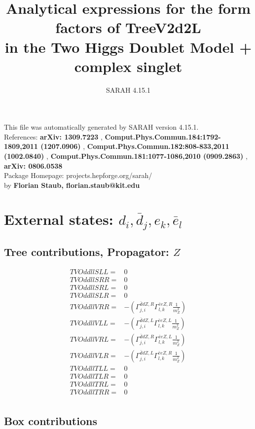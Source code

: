 \documentclass[A4,landscape]{article}
\begin{document}
\title{Analytical expressions for the form factors of TreeV2d2L\\ in the Two Higgs Doublet Model + complex singlet } 
 \author{SARAH 4.15.1} 
 \maketitle 
 \vspace{10cm} 
This file was automatically generated by SARAH version 4.15.1.  \\ 
References: {\bf arXiv: 1309.7223 }, {\bf Comput.Phys.Commun.184:1792-1809,2011 (1207.0906) }, {\bf Comput.Phys.Commun.182:808-833,2011 (1002.0840) }, {\bf Comput.Phys.Commun.181:1077-1086,2010 (0909.2863) }, {\bf arXiv: 0806.0538 } \\ 
Package Homepage: projects.hepforge.org/sarah/ \\ 
by {\bf Florian Staub, florian.staub@kit.edu} 
 \pagebreak 
 \tableofcontents 
 \pagebreak 
\section{External states: ${d_{{i}}, \bar{d}_{{j}}, e_{{k}}, \bar{e}_{{l}}}$} 
\subsection{Tree contributions, Propagator: $Z$} 

\begin{align} 
  TVOddllSLL= & 0 \\ 
  TVOddllSRR= & 0 \\ 
  TVOddllSRL= & 0 \\ 
  TVOddllSLR= & 0 \\ 
  TVOddllVRR= & -(\Gamma^{\bar{d}d Z ,R}_{j, i} \Gamma^{\bar{e}e Z ,R}_{l, k} \frac{1}{m^2_{Z}}) \\ 
  TVOddllVLL= & -(\Gamma^{\bar{d}d Z ,L}_{j, i} \Gamma^{\bar{e}e Z ,L}_{l, k} \frac{1}{m^2_{Z}}) \\ 
  TVOddllVRL= & -(\Gamma^{\bar{d}d Z ,R}_{j, i} \Gamma^{\bar{e}e Z ,L}_{l, k} \frac{1}{m^2_{Z}}) \\ 
  TVOddllVLR= & -(\Gamma^{\bar{d}d Z ,L}_{j, i} \Gamma^{\bar{e}e Z ,R}_{l, k} \frac{1}{m^2_{Z}}) \\ 
  TVOddllTLL= & 0 \\ 
  TVOddllTLR= & 0 \\ 
  TVOddllTRL= & 0 \\ 
  TVOddllTRR= & 0 \\ 
\end{align} 
\subsection{Box contributions} 
\end{document}
